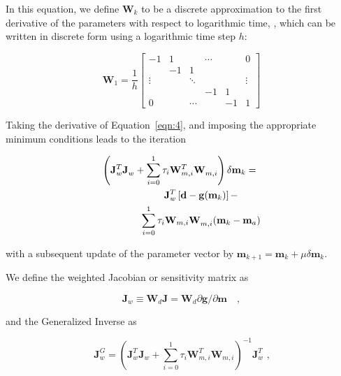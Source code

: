 \documentclass[cp]{copernicus}
\begin{document}
In this equation, we define $\mathbf{W}_k$ to be a discrete approximation to the
first derivative of the parameters with respect to logarithmic time, 
\cite[see][]{Aster2013a}, which can be written in discrete form using a 
logarithmic time step $h$:
 	 
\begin{equation}\label{eqn:6}
{{\mathbf{W}}_1} = \frac{1}{h}\left[ {\begin{array}{*{20}{c}}
  { - 1}&1&{}& \cdots &{}&0 \\ 
  {}&{ - 1}&1&{}&{}&{} \\ 
   \vdots &{}& \ddots &{}&{}& \vdots  \\ 
  {}&{}&{}&{ - 1}&1&{} \\ 
  0&{}& \cdots &{}&{ - 1}&1 
\end{array}} \right]\end{equation} 

Taking the derivative of Equation~\ref{eqn:4}, and imposing the appropriate minimum conditions leads 
to the iteration
	
\begin{equation}\label{eqn:7}
\begin{gathered}
  \left(\mathbf{J}_w^T\mathbf{J}_w^{} + 
  \sum\limits_{i = 0}^1 \tau_i \mathbf{W}_{m,i}^T\mathbf{W}_{m,i}^{}\right)      
  \delta\mathbf{m}_k =  \hfill \\
  \quad \quad \quad \quad \mathbf{J}_w^T\left[\mathbf{d}-
  \mathbf{g}(\mathbf{m}_k) \right] - \\
  \quad \quad \quad \quad  \sum\limits_{i = 0}^1 \tau _i \mathbf{W}_{m,i} 
  \mathbf{W}_{m,i}^{}(\mathbf{m}_k - \mathbf{m}_a) \hfill \\ 
\end{gathered}
\end{equation} 

 \noindent with a subsequent update of the parameter vector by 
 $\mathbf{m}_{k + 1} = \mathbf{m}_k + \mu \delta\mathbf{m}_k$.

We define the weighted Jacobian or sensitivity matrix as

\begin{equation}\label{eqn:8}
\mathbf{J}_w \equiv \mathbf{W}_d\mathbf{J} = 
\mathbf{W}_d\partial{\mathbf{g}}/\partial {\mathbf{m}}\quad, 
\end{equation} 

and the Generalized Inverse as

\begin{equation}\label{eqn:9}
\mathbf{J}_w^G  = \left(\mathbf{J}_w^T \mathbf{J}_w^{} + 
\sum\limits_{i = 0}^1 \tau_i \mathbf{W}_{m,i}^T \mathbf{W}_{m,i}^{}\right)^{-1} 
\mathbf{J}_w^T{\text{  ,}}
\end{equation} 
\end{document}
